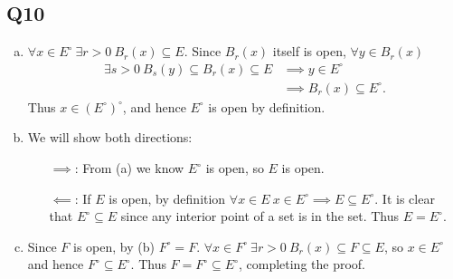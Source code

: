 \documentclass[12pt,lettersize]{article}
\begin{document}
	\subsection*{Q10}
	\begin{enumerate}[(a)]
		\item $\forall x\in E^\circ\ \exists r>0\ B_r(x)\subseteq E$. Since $B_r(x)$ itself is open, $\forall y\in B_r(x)$
		\begin{align*}
			\exists s>0\ B_s(y)\subseteq B_r(x)\subseteq E &\implies y\in E^\circ\\
														   &\implies B_r(x)\subseteq E^\circ.
		\end{align*}
		Thus $x\in(E^\circ)^\circ$, and hence $E^\circ$ is open by definition.
		\item We will show both directions:
		\begin{itemize}
			\item[$\implies$:] From (a) we know $E^\circ$ is open, so $E$ is open.
			\item[$\impliedby$:] If $E$ is open, by definition $\forall x\in E\ x\in E^\circ\implies E\subseteq E^\circ$. It is clear that $E^\circ\subseteq E$ since any interior point of a set is in the set. Thus $E=E^\circ$.
		\end{itemize}
		\item Since $F$ is open, by (b) $F^\circ=F$. $\forall x\in F^\circ\ \exists r>0\ B_r(x)\subseteq F\subseteq E$, so $x\in E^\circ$ and hence $F^\circ\subseteq E^\circ$. Thus $F=F^\circ\subseteq E^\circ$, completing the proof.
	\end{enumerate}
	\newpage
	
\end{document}
